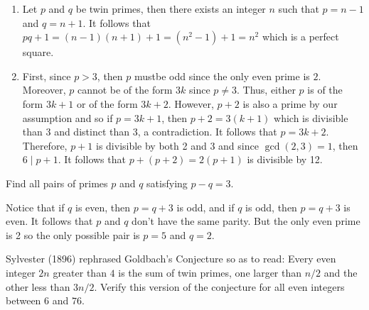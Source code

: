 \begin{solution}
    \begin{enumerate}
        \item Let $p$ and $q$ be twin primes, then there exists an integer $n$ such that $p = n-1$ and $q = n+1$. It follows that $pq + 1 = (n-1)(n+1) + 1 = (n^2 - 1) + 1 = n^2$ which is a perfect square. 
        \item First, since $p > 3$, then $p$ mustbe odd since the only even prime is $2$. Moreover, $p$ cannot be of the form $3k$ since $p \neq 3$. Thus, either $p$ is of the form $3k + 1$ or of the form $3k+2$. However, $p+2$ is also a prime by our assumption and so if $p = 3k+1$, then $p+2 = 3(k+1)$ which is divisible than 3 and distinct than 3, a contradiction. It follows that $p = 3k+2$. Therefore, $p + 1$ is divisible by both 2 and 3 and since $\gcd(2,3) = 1$, then $6 \mid p+1$. It follows that $p + (p+2) = 2(p+1)$ is divisible by 12.
    \end{enumerate}
\end{solution}

\begin{exercise}
    Find all pairs of primes $p$ and $q$ satisfying $p - q = 3$. \\
\end{exercise}

\begin{solution}
    Notice that if $q$ is even, then $p = q+3$ is odd, and if $q$ is odd, then $p = q+3$ is even. It follows that $p$ and $q$ don't have the same parity. But the only even prime is 2 so the only possible pair is $p = 5$ and $q = 2$. \\
\end{solution}

\begin{exercise}
    Sylvester (1896) rephrased Goldbach's Conjecture so as to read: Every even integer $2n$ greater than $4$ is the sum of twin primes, one larger than $n/2$ and the other less than $3n/2$. Verify this version of the conjecture for all even integers between $6$ and $76$. \\
\end{exercise}


